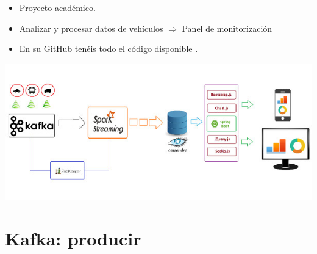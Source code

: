 \documentclass[dvipsnames]{beamer}
\begin{document}
        \begin{frame}
          \begin{itemize}
          \item Proyecto académico.
          \item Analizar y procesar datos de vehículos $\Rightarrow$ Panel de monitorización
          \item En su \href{https://github.com/baghelamit/iot-traffic-monitor}{\textcolor{deepBlue}{GitHub}} tenéis todo el código disponible \Winkey.
          \end{itemize}
        \end{frame}

        \begin{frame}
          \begin{center}
          \includegraphics[scale=0.5]{img/arquitectura.jpg}  
          \end{center}          
        \end{frame}

        \section{Kafka: producir}
	
\end{document}
